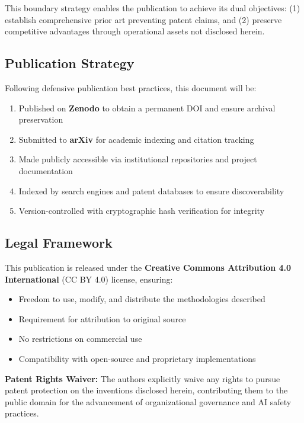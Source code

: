 \documentclass[11pt,a4paper]{article}
\begin{document}
This boundary strategy enables the publication to achieve its dual objectives: (1) establish comprehensive prior art preventing patent claims, and (2) preserve competitive advantages through operational assets not disclosed herein.

\subsection{Publication Strategy}

Following defensive publication best practices\cite{defensive_pub_strategy}, this document will be:

\begin{enumerate}
\item Published on \textbf{Zenodo} to obtain a permanent DOI and ensure archival preservation
\item Submitted to \textbf{arXiv} for academic indexing and citation tracking
\item Made publicly accessible via institutional repositories and project documentation
\item Indexed by search engines and patent databases to ensure discoverability
\item Version-controlled with cryptographic hash verification for integrity
\end{enumerate}

\subsection{Legal Framework}

This publication is released under the \textbf{Creative Commons Attribution 4.0 International} (CC BY 4.0) license, ensuring:

\begin{itemize}
\item Freedom to use, modify, and distribute the methodologies described
\item Requirement for attribution to original source
\item No restrictions on commercial use
\item Compatibility with open-source and proprietary implementations
\end{itemize}

\textbf{Patent Rights Waiver:} The authors explicitly waive any rights to pursue patent protection on the inventions disclosed herein, contributing them to the public domain for the advancement of organizational governance and AI safety practices.
\end{document}
